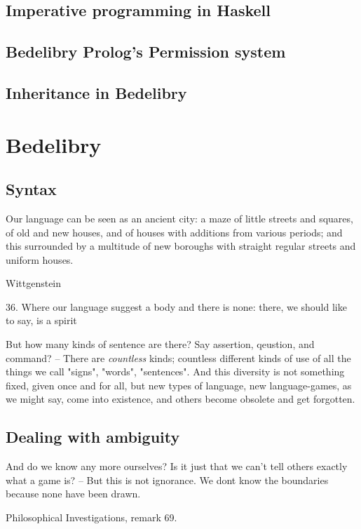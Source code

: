 \documentclass{book}
\begin{document}
\section{Imperative programming in Haskell}

\section{Bedelibry Prolog's Permission system}

\section{Inheritance in Bedelibry}



\chapter{Bedelibry}

\section{Syntax}

\epigraph{Our language can be seen as an ancient city: a maze of little streets and squares, of old and new houses, and of houses with additions from various periods; and this surrounded by a multitude of new boroughs with straight regular streets and uniform houses.}{Wittgenstein}

36. Where our language suggest a body and there is none: there, we should like to say, is a spirit

But how many kinds of sentence are there? Say assertion, qeustion, and command? -- There are \textit{countless} kinds; countless different kinds of use of all the things we call "signs", "words", "sentences". And this diversity is not something fixed, given once and for all, but new types of language, new language-games, as we might say, come into existence, and others become obsolete and get forgotten.

\section{Dealing with ambiguity}

\epigraph{And do we know any more ourselves? Is it just that we can't tell others exactly what a game is? -- But this is not ignorance. We dont know the boundaries because none have been drawn.}{Philosophical Investigations, remark 69.}
\end{document}
